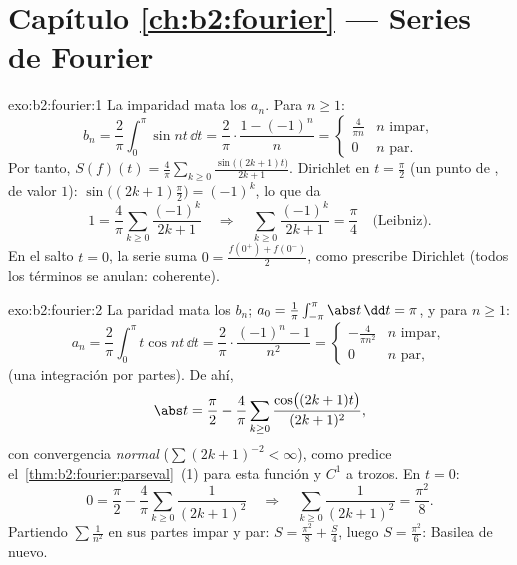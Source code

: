 \section*{Capítulo \ref{ch:b2:fourier} --- Series de Fourier}

\begin{solution}{exo:b2:fourier:1}
La imparidad mata los $a_n$. Para $n \geq 1$:
\[
b_n = \frac{2}{\pi}\int_0^{\pi} \sin nt\,\dd t
= \frac{2}{\pi}\cdot\frac{1 - (-1)^n}{n}
= \begin{cases} \frac{4}{\pi n} & n \text{ impar},\\ 0 & n
\text{ par}. \end{cases}
\]
Por tanto, $S(f)(t) = \frac{4}{\pi}\sum_{k\geq0}
\frac{\sin\bigl((2k+1)t\bigr)}{2k+1}$. Dirichlet en $t = \frac\pi2$
(un punto de , de valor $1$):
$\sin\bigl((2k+1)\frac\pi2\bigr) = (-1)^k$, lo que da
\[
1 = \frac4\pi \sum_{k\geq0}\frac{(-1)^k}{2k+1}
\quad\Longrightarrow\quad
\sum_{k\geq0}\frac{(-1)^k}{2k+1} = \frac{\pi}{4}
\quad\text{(Leibniz)}.
\]
En el salto $t = 0$, la serie suma $0 = \frac{f(0^+) + f(0^-)}{2}$,
como prescribe Dirichlet (todos los términos se anulan: coherente).
\end{solution}

\begin{solution}{exo:b2:fourier:2}
La paridad mata los $b_n$; $a_0 = \frac{1}{\pi}\int_{-\pi}^\pi\abs
t\,\dd t = \pi$, y para $n \geq 1$:
\[
a_n = \frac{2}{\pi}\int_0^\pi t\cos nt\,\dd t
= \frac{2}{\pi}\cdot\frac{(-1)^n - 1}{n^2}
= \begin{cases} -\frac{4}{\pi n^2} & n \text{ impar},\\ 0 & n
\text{ par}, \end{cases}
\]
(una integración por partes). De ahí,
\[
\abs t = \frac{\pi}{2} - \frac{4}{\pi}\sum_{k\geq0}
\frac{\cos\bigl((2k+1)t\bigr)}{(2k+1)^2} ,
\]
con convergencia \emph{normal} ($\sum (2k+1)^{-2} < \infty$), como
predice el~\cref{thm:b2:fourier:parseval}~(1) para esta función
 y $C^1$ a trozos. En $t = 0$:
\[
0 = \frac\pi2 - \frac4\pi\sum_{k\geq0}\frac{1}{(2k+1)^2}
\quad\Longrightarrow\quad
\sum_{k\geq0}\frac{1}{(2k+1)^2} = \frac{\pi^2}{8} .
\]
Partiendo $\sum \frac{1}{n^2}$ en sus partes impar y par: $S =
\frac{\pi^2}{8} + \frac S4$, luego $S = \frac{\pi^2}{6}$: Basilea de
nuevo.
\end{solution}

